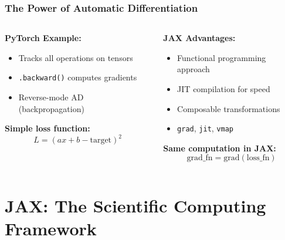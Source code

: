 \documentclass[notes]{beamer}
\begin{document}
\begin{frame}
\frametitle{The Power of Automatic Differentiation}

\begin{columns}[T]
    \begin{column}{0.5\textwidth}
        \textbf{PyTorch Example:}
        \begin{itemize}
            \item Tracks all operations on tensors
            \item \texttt{.backward()} computes gradients
            \item Reverse-mode AD (backpropagation)
        \end{itemize}
        
        \vspace{0.5cm}
        
        \textbf{Simple loss function:}
        \begin{equation*}
        L = (ax + b - \text{target})^2
        \end{equation*}
    \end{column}
    \begin{column}{0.5\textwidth}
        \textbf{JAX Advantages:}
        \begin{itemize}
            \item Functional programming approach
            \item JIT compilation for speed
            \item Composable transformations
            \item \texttt{grad}, \texttt{jit}, \texttt{vmap}
        \end{itemize}
        
        \vspace{0.5cm}
        
        \textbf{Same computation in JAX:}
        \begin{equation*}
        \text{grad\_fn} = \text{grad}(\text{loss\_fn})
        \end{equation*}
    \end{column}
\end{columns}

\end{frame}

\section{JAX: The Scientific Computing Framework}
\end{document}
